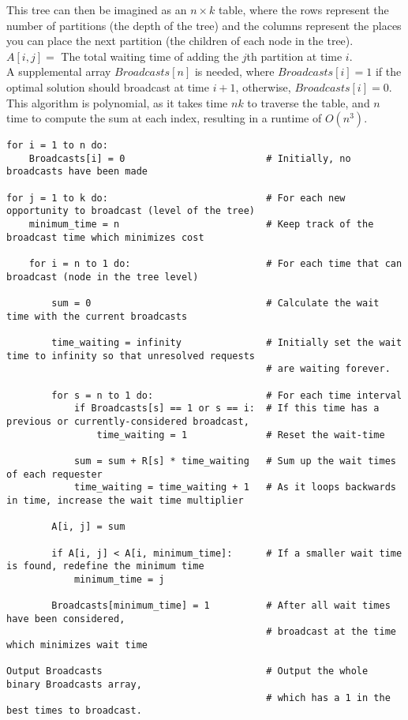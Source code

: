 \documentclass[letterpaper,notitlepage,twoside]{article}
\begin{document}
This tree can then be imagined as an $n\times k$ table, where the rows represent the number of partitions (the depth of the tree) and the columns represent the places you can place the next partition (the children of each node in the tree). $A[i, j] =$ The total waiting time of adding the $j$th partition at time $i$. \\
A supplemental array $Broadcasts[n]$ is needed, where $Broadcasts[i] = 1$ if the optimal solution should broadcast at time $i + 1$, otherwise, $Broadcasts[i] = 0$.
This algorithm is polynomial, as it takes time $nk$ to traverse the table, and $n$ time to compute the sum at each index, resulting in a runtime of $O(n^3)$.
\begin{verbatim}
for i = 1 to n do:
    Broadcasts[i] = 0                         # Initially, no broadcasts have been made

for j = 1 to k do:                            # For each new opportunity to broadcast (level of the tree)
    minimum_time = n                          # Keep track of the broadcast time which minimizes cost
    
    for i = n to 1 do:                        # For each time that can broadcast (node in the tree level)  
  
        sum = 0                               # Calculate the wait time with the current broadcasts
  
        time_waiting = infinity               # Initially set the wait time to infinity so that unresolved requests
                                              # are waiting forever.

        for s = n to 1 do:                    # For each time interval
            if Broadcasts[s] == 1 or s == i:  # If this time has a previous or currently-considered broadcast,
                time_waiting = 1              # Reset the wait-time
                
            sum = sum + R[s] * time_waiting   # Sum up the wait times of each requester
            time_waiting = time_waiting + 1   # As it loops backwards in time, increase the wait time multiplier
                
        A[i, j] = sum
            
        if A[i, j] < A[i, minimum_time]:      # If a smaller wait time is found, redefine the minimum time
            minimum_time = j
        
        Broadcasts[minimum_time] = 1          # After all wait times have been considered,
                                              # broadcast at the time which minimizes wait time

Output Broadcasts                             # Output the whole binary Broadcasts array,
                                              # which has a 1 in the best times to broadcast.
\end{verbatim}
\end{document}
